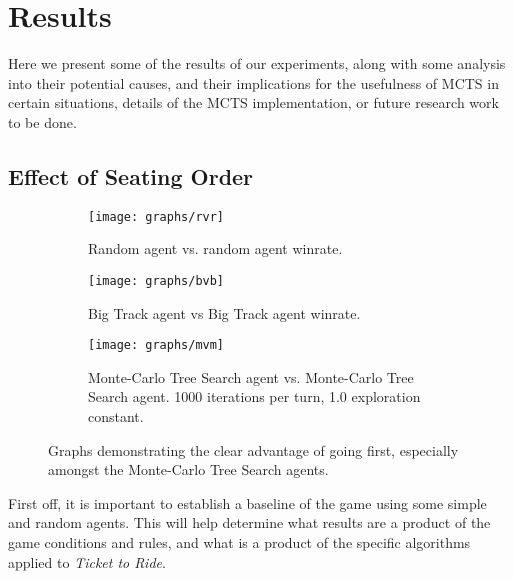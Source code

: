 \documentclass[11pt, letterpaper, twoside]{article}
\begin{document}
\section{Results}

Here we present some of the results of our experiments, along with some analysis into their potential causes, and their implications for the usefulness of MCTS in certain situations, details of the MCTS implementation, or future research work to be done.

\subsection{Effect of Seating Order}

\begin{figure}
\centering
\begin{subfigure}{.5\textwidth}
  	\centering
  	\texttt{[image: graphs/rvr]}
  	\caption{Random agent vs. random agent winrate.}
  	\label{fig:rvr}
\end{subfigure}%
\begin{subfigure}{.5\textwidth}
  	\centering
  	\texttt{[image: graphs/bvb]}
  	\caption{Big Track agent vs Big Track agent winrate.}
  	\label{fig:bvb}
\end{subfigure}
\begin{subfigure}{.5\textwidth}
	\centering
	\texttt{[image: graphs/mvm]}
	\caption{Monte-Carlo Tree Search agent vs. Monte-Carlo Tree Search agent. 1000 iterations per turn, 1.0 exploration constant.}
	\label{fig:mvm}
\end{subfigure}
\caption{Graphs demonstrating the clear advantage of going first, especially amongst the Monte-Carlo Tree Search agents.}
\label{fig:graphs-seat-effect}
\end{figure}

First off, it is important to establish a baseline of the game using some simple and random agents. This will help determine what results are a product of the game conditions and rules, and what is a product of the specific algorithms applied to \textit{Ticket to Ride}. 
\end{document}
